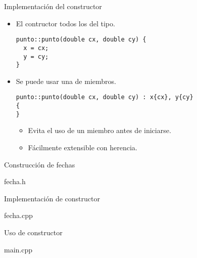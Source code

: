\begin{frame}[t,fragile]{Implementación del constructor}
\begin{itemize}
  \item El contructor  todos los  del tipo.
\begin{lstlisting}
punto::punto(double cx, double cy) {
  x = cx;
  y = cy;
}
\end{lstlisting}

  \item Se puede usar una  de miembros.
\begin{lstlisting}
punto::punto(double cx, double cy) : x{cx}, y{cy}
{
}
\end{lstlisting}
    \begin{itemize}
      \item Evita el uso de un miembro antes de iniciarse.
      \item Fácilmente extensible con herencia.
    \end{itemize}
\end{itemize}
\end{frame}

\begin{frame}[t]{Construcción de fechas}
\begin{block}{fecha.h}

\end{block}
\end{frame}

\begin{frame}[t]{Implementación de constructor}
\begin{block}{fecha.cpp}

\end{block}
\end{frame}

\begin{frame}[t]{Uso de constructor}
\begin{block}{main.cpp}

\end{block}
\end{frame}

